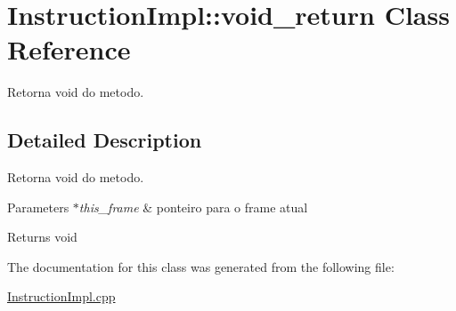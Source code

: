 \hypertarget{class_instruction_impl_1_1void__return}{}\section{Instruction\+Impl\+:\+:void\+\_\+return Class Reference}
\label{class_instruction_impl_1_1void__return}


Retorna void do metodo.  




\subsection{Detailed Description}
Retorna void do metodo. 


\begin{DoxyParams}{Parameters}
{\em $\ast$this\+\_\+frame} & ponteiro para o frame atual \\
\hline
\end{DoxyParams}
\begin{DoxyReturn}{Returns}
void 
\end{DoxyReturn}


The documentation for this class was generated from the following file\+:\begin{DoxyCompactItemize}
\item 
\hyperlink{_instruction_impl_8cpp}{Instruction\+Impl.\+cpp}\end{DoxyCompactItemize}

